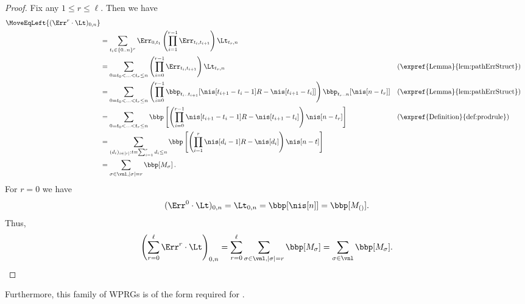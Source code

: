 \begin{proof}
Fix any $1\leq r\leq \ell$. %
Then we have  %
\begin{align*}
    \MoveEqLeft{(\Err^r\cdot\Lt)_{0,n}}\\
    &= \sum_{t_i\in \{0..n\}^{r}}\Err_{0,t_1}\left(\prod_{i=1}^{r-1}\Err_{t_i,t_{i+1}}\right)\Lt_{t_r,n}\\
    &= \sum_{0=t_0<\ldots<t_r\leq n}\left(\prod_{i=0}^{r-1}\Err_{t_i,t_{i+1}}\right)\Lt_{t_r,n} && \text{(\expref{Lemma}{lem:pathErrStruct})}\\
    &= \sum_{0=t_0<\ldots<t_r\leq n}\left(\prod_{i=0}^{r-1}\bbp_{t_i..t_{i+1}}[\nis[t_{i+1}-t_i-1]R-\nis[t_{i+1}-t_i]]\right)\bbp_{t_r..n}[\nis[n-t_r]] && \text{(\expref{Lemma}{lem:pathErrStruct})}\\
    &= \sum_{0=t_0<\ldots<t_r\leq n}\bbp\left[\left(\prod_{i=0}^{r-1}\nis[t_{i+1}-t_i-1]R-\nis[t_{i+1}-t_i]\right)\nis[n-t_r]\right] && \text{(\expref{Definition}{def:prodrule})}\\
    &= \sum_{(d_i)_{i\in [r]}:t=\sum_{i=1}^rd_i\leq n}\bbp\left[\left(\prod_{i=1}^{r}\nis[d_i-1]R-\nis[d_i]\right)\nis[n-t]\right]\\
    &= \sum_{\sigma \in \vnl,|\sigma|=r}\bbp[M_\sigma]\,.
\end{align*} 
For $r=0$ we have $$(\Err^0\cdot\Lt)_{0,n}=\Lt_{0,n}=\bbp[\nis[n]]=\bbp[M_{()}].$$
Thus,
\[\left(\sum_{r=0}^\ell \Err^r\cdot\Lt\right)_{0,n}=\sum_{r=0}^\ell \sum_{\sigma \in \vnl,|\sigma|=r}\bbp[M_\sigma]= \sum_{\sigma \in \vnl}\bbp[M_\sigma].\qedhere\]
\end{proof}
Furthermore, this family of WPRGs is of the form required for .

